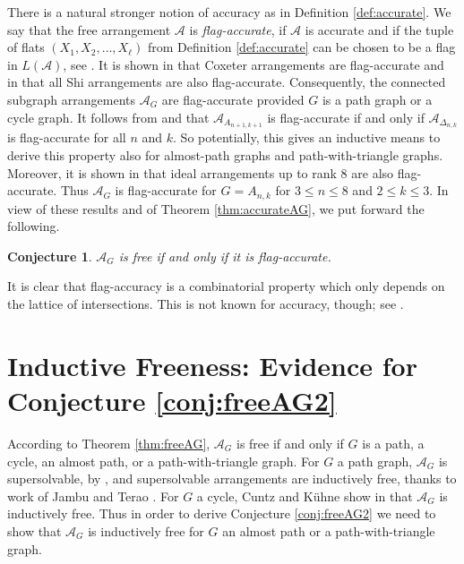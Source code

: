\documentclass[12pt]{amsart}
\newcommand\CA{{\mathscr A}}
\numberwithin{equation}{section}
\theoremstyle{plain}
\newtheorem{conjecture}[equation]{Conjecture}
\theoremstyle{definition}
\begin{document}
There is a natural stronger notion of accuracy as in Definition \ref{def:accurate}. We say that the free arrangement $\CA$ is \emph{flag-accurate}, if $\CA$ is accurate and if the tuple 
of flats $(X_1, X_2, \ldots, X_\ell)$ from Definition \ref{def:accurate} can be chosen to be a flag in $L(\CA)$, see \cite[Def.~1.1]{mueckschroehrletran:flagaccurate}.
It is shown in \cite[Cor.~1.7]{mueckschroehrletran:flagaccurate} that Coxeter arrangements are flag-accurate and in \cite[Thm.~1.14]{mueckschroehrletran:flagaccurate} that all Shi arrangements are also flag-accurate. Consequently, the connected subgraph arrangements $\CA_G$ are flag-accurate provided $G$ is a path graph or a cycle graph.
It follows from 
\cite[Lem.~3.1]{mueckschroehrletran:flagaccurate} and \cite[Thm.~4.1, Prop.~5.1, Thm.~5.4]{cuntzkuehne:subgraphs}
that $\CA_{A_{n+1,k+1}}$ is flag-accurate if and only if 
$\CA_{\Delta_{n,k}}$ is flag-accurate 
for all $n$ and $k$.
So potentially, this gives an inductive means to derive this property also for almost-path graphs and path-with-triangle graphs.
Moreover, it is shown in \cite[Thm.~4.8]{mueckschroehrletran:flagaccurate} that ideal arrangements up to rank $8$ are also flag-accurate. Thus $\CA_G$ is flag-accurate 
for $ G = A_{n,k}$ for $3 \le n \le 8$ and $2\le k \le 3$. 
In view of these results and of Theorem \ref{thm:accurateAG}, we 
put forward the following.

\begin{conjecture}
	\label{conj:flag-accAG}
	$\CA_G$ is free if and only if it is flag-accurate.
\end{conjecture}
 
 It is clear that flag-accuracy is a combinatorial property which only depends on the lattice of intersections. This is not known for 
 accuracy, though; see \cite[Rem.~1.3]{mueckschroehrletran:flagaccurate}.


\section{Inductive Freeness: Evidence for Conjecture \ref{conj:freeAG2}}
\label{s:conj:freeAG2}

According to Theorem \ref{thm:freeAG},
$\CA_G$ is free if and only if $G$ is
a path, a cycle, an almost path, or a path-with-triangle graph.
For $G$ a path graph, $\CA_G$ is supersolvable, by \cite[Cor.~8.11]{cuntzkuehne:subgraphs}, and supersolvable arrangements are inductively free,
thanks to work of Jambu and Terao \cite[Thm.~4.2]{jambuterao:free}.
For $G$ a cycle,
Cuntz and K\"uhne show in
\cite[Prop.~3.1]{cuntzkuehne:subgraphs} that
$\CA_G$ is  inductively free.
Thus in order to derive Conjecture \ref{conj:freeAG2} we need to show that $\CA_G$ is  inductively free for
$G$ an almost path or a path-with-triangle graph.
\end{document}
